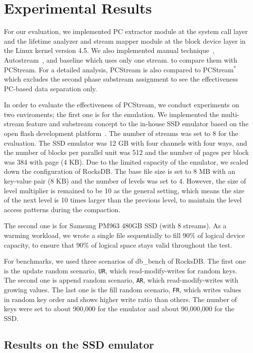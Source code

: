 \section{Experimental Results}
For our evaluation, we implemented PC extractor module at the 
system call layer 
and the lifetime analyzer and stream mapper module 
at the block device layer in the Linux kernel version 4.5.
We also implemented {\sf manual} technique~\cite{MultiStream}, 
{\sf Autostream}~\cite{AutoStream}, and
{\sf baseline} which uses only one stream.
to compare them with {\sf PCStream}.
For a detailed analysis, {\sf PCStream} is also compared to {\sf PCStream}$^{*}$
which excludes the second phase substream assignment 
to see the effectiveness PC-based data separation only.

In order to evaluate the effectiveness of {\sf PCStream},
we conduct experiments on two enviroments; the first one is 
for the emulation.
We implemented the multi-stream feature and substream concept
to the in-house SSD emulator
based on the open flash development platform~\cite{AMF}.
The number of streams was set to 8 for the evaluation.
The SSD emulator was 12 GB with four channels with four ways, and 
the number of blocks per parallel unit was 512 and
the number of pages per block was 384 with page (4 KB).
Due to the limited capacity of the emulator, 
we scaled down the configuration of RocksDB.
The base file size is set to 8 MB
with an key-value pair (8 KB) and the number of levels was set to 4.
However, the size of level multiplier is remained to be 10 as the general setting,
which means the size of the next level is 10 times larger than the previous level,
to maintain the level access patterns during the compaction.

The second one is for Samsung PM963 480GB SSD (with 8 streams).
As a warming workload, we wrote a single file sequentially to fill 90\%
of logical device capacity, to ensure that 90\% of logical space stays valid
throughout the test.

For benchmarks, we used three scenarios of db\_bench of RocksDB.
The first one is the update random scenario, {\tt UR}, which read-modify-writes for random keys. 
The second one is append random scenario, {\tt AR}, which read-modify-writes with growing values.
The last one is the fill random scenario, {\tt FR}, which writes values in random key order and 
shows higher write ratio than others.
The number of keys were set to about 900,000 for the emulator and about 90,000,000 for
the SSD.

\subsection{Results on the SSD emulator}


